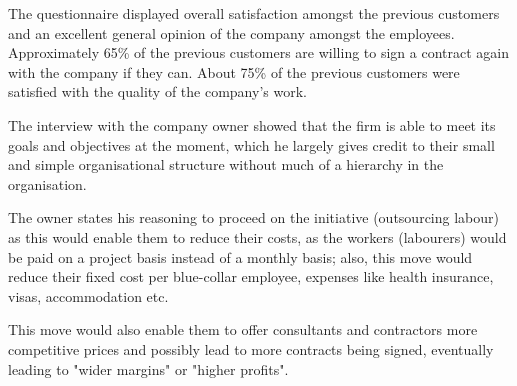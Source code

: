 {The questionnaire displayed overall satisfaction amongst the previous customers and an excellent general opinion of the company amongst the employees. Approximately 65\% of the previous customers are willing to sign a contract again with the company if they can. About 75\% of the previous customers were satisfied with the quality of the company's work.}

{The interview with the company owner showed that the firm is able to meet its goals and objectives at the moment, which he largely gives credit to their small and simple organisational structure without much of a hierarchy in the organisation.}

{The owner states his reasoning to proceed on the initiative (outsourcing labour) as this would enable them to reduce their costs, as the workers (labourers) would be paid on a project basis instead of a monthly basis; also, this move would reduce their fixed cost per blue-collar employee, expenses like health insurance, visas, accommodation etc.}

{This move would also enable them to offer consultants and contractors more competitive prices and possibly lead to more contracts being signed, eventually leading to "wider margins" or "higher profits".}

